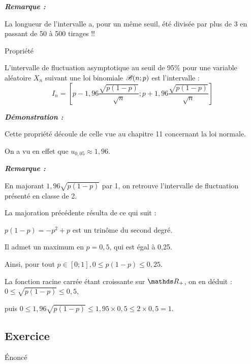 \begin{spacing}{1.2}
\medskip

\textbf{\textit{Remarque :}}

La longueur de l'intervalle a, pour un même seuil, été divisée par plus de 3 en passant de 50 à 500 tirages \quad !!

\medskip

\begin{bclogo}[couleur = gray!30 , arrondi = 0.1 ,logo = \bclampe , barre = snake , tailleOndu = 1.5]{Propriété}

L'intervalle de fluctuation asymptotique au seuil de 95\% pour une variable aléatoire $X_n$ suivant une loi binomiale $\mathscr{B}(n;p)$ est l'intervalle :
\[I_n=\left[p-1,96\frac{\sqrt{p(1-p)}}{\sqrt{n}};p+1,96\frac{\sqrt{p(1-p)}}{\sqrt{n}}\right]\]

\end{bclogo}

\bigskip

\textbf{\textit{Démonstration :}}

Cette propriété découle de celle vue au chapitre 11 concernant la loi normale.

On a vu en effet que $u_{0,05}\approx 1,96$.

\medskip

\textbf{\textit{Remarque :}}

En majorant $1,96\sqrt{p(1-p)}$ par 1, on retrouve l'intervalle de fluctuation présenté en classe de 2.

La majoration précédente résulta de ce qui suit :

$p(1-p)=-p^2+p$ est un trinôme du second degré.

Il admet un maximum en $p=0,5$, qui est égal à 0,25.

Ainsi, pour tout $p\in [0;1], 0\leq p(1-p)\leq 0,25$.

La fonction racine carrée étant croissante sur $\R_+$, on en déduit : $0\leq \sqrt{p(1-p)}\leq 0,5$, 

puis $0\leq 1,96\sqrt{p(1-p)}\leq 1,95\times 0,5\leq 2\times 0,5=1$.

\subsection{Exercice}

\begin{bclogo}[couleur = blue!30 , arrondi = 0.1 ,logo = \bclampe , barre = snake , tailleOndu = 1.5]{\'Enoncé}


\end{bclogo}
\end{spacing}
